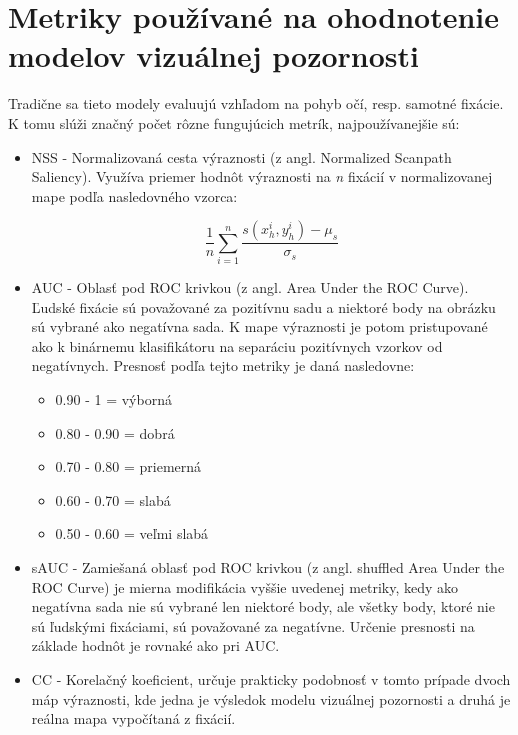 \section{Metriky používané na ohodnotenie modelov vizuálnej pozornosti}
\label{metric}
Tradične sa tieto modely evaluujú vzhľadom na pohyb očí, resp. samotné fixácie. K tomu slúži značný počet rôzne fungujúcich metrík\cite{metriky}, najpoužívanejšie sú:

\begin{itemize}
	
	\item NSS - Normalizovaná cesta výraznosti (z angl. Normalized Scanpath Saliency). Využíva priemer hodnôt výraznosti na \textit{n} fixácií v normalizovanej mape podľa nasledovného vzorca: 
	
	\begin{equation}
	\frac{1}{n} \sum_{i=1}^{n} \frac{s(x_{h}^{i}, y_{h}^{i}) - \mu_{s}}{\sigma _{s}}
	\end{equation}
	
	\item AUC - Oblasť pod ROC krivkou (z angl. Area Under the ROC Curve).
	Ľudské fixácie sú považované za pozitívnu sadu a niektoré body na obrázku sú vybrané ako negatívna sada. K mape výraznosti je potom pristupované ako k binárnemu klasifikátoru na separáciu pozitívnych vzorkov od negatívnych. Presnosť podľa tejto metriky je daná nasledovne: 
	
	\begin{itemize}
		
		\item 0.90 - 1 = výborná
		\item 0.80 - 0.90 = dobrá
		\item 0.70 - 0.80 = priemerná
		\item 0.60 - 0.70 = slabá
		\item 0.50 - 0.60 = veľmi slabá
		
	\end{itemize}
	
	\item sAUC - Zamiešaná oblasť pod ROC krivkou (z angl. shuffled Area Under the ROC Curve) je mierna modifikácia vyššie uvedenej metriky, kedy ako negatívna sada nie sú vybrané len niektoré body, ale všetky body, ktoré nie sú ľudskými fixáciami, sú považované za negatívne. Určenie presnosti na základe hodnôt je rovnaké ako pri AUC. 
	
	\item CC - Korelačný koeficient, určuje prakticky podobnosť v tomto prípade dvoch máp výraznosti, kde jedna je výsledok modelu vizuálnej pozornosti a druhá je reálna mapa vypočítaná z fixácií. 
	

\end{itemize}
